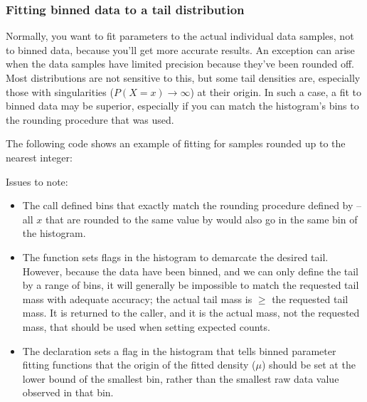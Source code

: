 \subsubsection{Fitting binned data to a tail distribution}

Normally, you want to fit parameters to the actual individual data
samples, not to binned data, because you'll get more accurate results.
An exception can arise when the data samples have limited precision
because they've been rounded off. Most distributions are not sensitive
to this, but some tail densities are, especially those with
singularities ($P(X=x) \rightarrow \infty$) at their origin. In such a
case, a fit to binned data may be superior, especially if you can
match the histogram's bins to the rounding procedure that was used.

The following code shows an example of fitting for samples rounded up
to the nearest integer:



Issues to note:

\begin{itemize}
\item The  call
      defined bins that exactly match the rounding procedure
      defined by  -- all $x$ that are rounded
      to the same value by  would also go in
      the same bin of the histogram.

\item The  function sets flags
      in the histogram to demarcate the desired tail.  However,
      because the data have been binned, and we can only define the
      tail by a range of bins, it will generally be impossible to
      match the requested tail mass with adequate accuracy; the actual
      tail mass is $\geq$ the requested tail mass. It is returned
      to the caller, and it is the actual mass, not the requested mass,
      that should be used when setting expected counts.

\item The  declaration
      sets a flag in the histogram that tells binned parameter
      fitting functions that the origin of the fitted
      density ($\mu$) should be set at the lower bound of the smallest bin,
      rather than the smallest raw data value observed in that 
      bin. 
\end{itemize}


